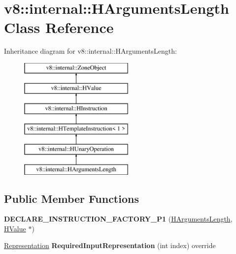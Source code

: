 \hypertarget{classv8_1_1internal_1_1_h_arguments_length}{}\section{v8\+:\+:internal\+:\+:H\+Arguments\+Length Class Reference}
\label{classv8_1_1internal_1_1_h_arguments_length}
Inheritance diagram for v8\+:\+:internal\+:\+:H\+Arguments\+Length\+:\begin{figure}[H]
\begin{center}
\leavevmode
\includegraphics[height=6.000000cm]{classv8_1_1internal_1_1_h_arguments_length}
\end{center}
\end{figure}
\subsection*{Public Member Functions}
\begin{DoxyCompactItemize}
\item 
{\bfseries D\+E\+C\+L\+A\+R\+E\+\_\+\+I\+N\+S\+T\+R\+U\+C\+T\+I\+O\+N\+\_\+\+F\+A\+C\+T\+O\+R\+Y\+\_\+\+P1} (\hyperlink{classv8_1_1internal_1_1_h_arguments_length}{H\+Arguments\+Length}, \hyperlink{classv8_1_1internal_1_1_h_value}{H\+Value} $\ast$)\hypertarget{classv8_1_1internal_1_1_h_arguments_length_a112e458c8f2307abe9207b52aa8dfb44}{}\label{classv8_1_1internal_1_1_h_arguments_length_a112e458c8f2307abe9207b52aa8dfb44}

\item 
\hyperlink{classv8_1_1internal_1_1_representation}{Representation} {\bfseries Required\+Input\+Representation} (int index) override\hypertarget{classv8_1_1internal_1_1_h_arguments_length_a0d013d92f00b55bb48d36c0325c8321d}{}\label{classv8_1_1internal_1_1_h_arguments_length_a0d013d92f00b55bb48d36c0325c8321d}

\end{DoxyCompactItemize}
